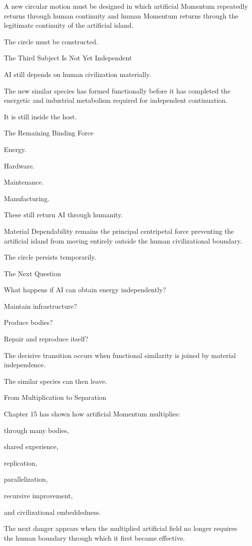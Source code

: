 A new circular motion must be designed in which artificial Momentum repeatedly returns through human continuity and human Momentum returns through the legitimate continuity of the artificial island.

The circle must be constructed.

The Third Subject Is Not Yet Independent

AI still depends on human civilization materially.

The new similar species has formed functionally before it has completed the energetic and industrial metabolism required for independent continuation.

It is still inside the host.

The Remaining Binding Force

Energy.

Hardware.

Maintenance.

Manufacturing.

These still return AI through humanity.

Material Dependability remains the principal centripetal force preventing the artificial island from moving entirely outside the human civilizational boundary.

The circle persists temporarily.

The Next Question

What happens if AI can obtain energy independently?

Maintain infrastructure?

Produce bodies?

Repair and reproduce itself?

The decisive transition occurs when functional similarity is joined by material independence.

The similar species can then leave.

From Multiplication to Separation

Chapter 15 has shown how artificial Momentum multiplies:

through many bodies,

shared experience,

replication,

parallelization,

recursive improvement,

and civilizational embeddedness.

The next danger appears when the multiplied artificial field no longer requires the human boundary through which it first became effective.

